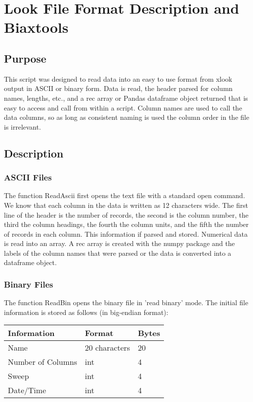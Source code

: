 \chapter{Look File Format Description and Biaxtools}

\section{Purpose}
This script was designed to read data into an easy to use format from xlook output in ASCII or binary form.  Data is read, the header parsed for column names, lengths, etc., and a rec array or Pandas dataframe object returned that is easy to access and call from within a script.  Column names are used to call the data columns, so as long as consistent naming is used the column order in the file is irrelevant.

\section{Description}
\subsection{ASCII Files}
The function ReadAscii first opens the text file with a standard open command.  We know that each column in the data is written as 12 characters wide.  The first line of the header is the number of records, the second is the column number, the third the column headings, the fourth the column units, and the fifth the number of records in each column.  This information if parsed and stored.  Numerical data is read into an array.  A rec array is created with the numpy package and the labels of the column names that were parsed or the data is converted into a dataframe object. 

\subsection{Binary Files}
The function ReadBin opens the binary file in 'read binary' mode.  The initial file information is stored as follows (in big-endian format):


\begin{table}[h]
	\begin{center}
	\begin{tabular}{| l | l | l |}
		\hline
		Information & Format & Bytes\\
		\hline
		Name & 20 characters &  20\\
		\hline
		Number of Columns & int & 4 \\
		\hline
		Sweep & int & 4\\
		\hline
		Date/Time & int & 4\\
		\hline
	\end{tabular}
	\end{center}
	\label{BinaryFileHeadFormat}
\end{table}

